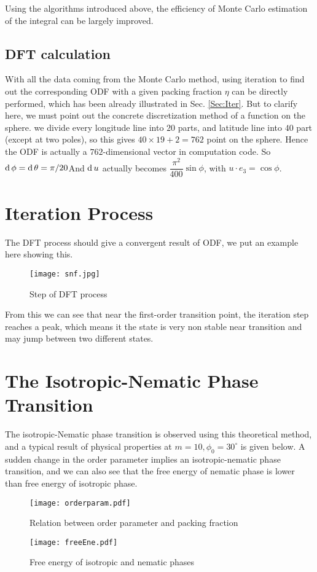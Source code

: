 Using the algorithms introduced above, the efficiency of Monte Carlo estimation of the integral can be largely improved.

\subsection{DFT calculation}
With all the data coming from the Monte Carlo method, using iteration to find out the corresponding ODF with a given packing fraction $\eta$ can be directly performed, which has been already illustrated in Sec. \ref{Sec:Iter}. But to clarify here, we must point out the concrete discretization method of a function on the sphere. we divide every longitude line into $20$ parts, and latitude line into $40$ part (except at two poles), so this gives $40\times 19+2 = 762$ point on the sphere. Hence the ODF is actually a $762$-dimensional vector in computation code. So $\operatorname{d}\phi=\operatorname{d}\theta =\pi/20$And $\operatorname{d}u$ actually becomes $\dfrac{\pi^2}{400}\sin\phi$, with $u\cdot e_3=\cos\phi$.

\section{Iteration Process}

The DFT process should give a convergent result of ODF, we put an example here showing this.
\begin{figure}[H]
 	\centering
 	\texttt{[image: snf.jpg]} \\
	\caption[Step of DFT process]{Step of DFT process}
	\label{fig:DFTstep}
\end{figure}
From this we can see that near the first-order transition point, the iteration step reaches a peak, which means it the state is very non stable near transition and may jump between two different states.

\section{The Isotropic-Nematic Phase Transition}
The isotropic-Nematic phase transition is observed using this theoretical method, and a typical result of physical properties at $m=10, \phi_0=30^\circ$ is given below. A sudden change in the order parameter implies an isotropic-nematic phase transition, and we can also see that the free energy of nematic phase is lower than free energy of isotropic phase.
\begin{figure}[H]
	\begin{minipage}{0.5\textwidth}
		\centering
		\texttt{[image: orderparam.pdf]}
		\caption{Relation between order parameter and packing fraction}
		\label{fig:orderParam}
	\end{minipage}\hfill
	\begin{minipage}{0.5\textwidth}
 		\centering
 		\texttt{[image: freeEne.pdf]}
 		\caption{Free energy of isotropic and nematic phases}
 		\label{fig:freeEne}
 	\end{minipage}
\end{figure}

